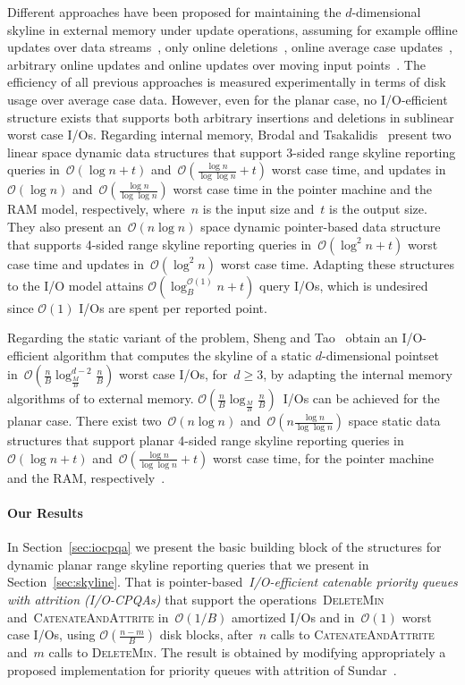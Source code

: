 \documentclass[]{article}
\newcommand{\bigO}{\mathcal{O}}
\begin{document}
Different approaches have been proposed for maintaining the $d$-dimensional
skyline in external memory under update operations, assuming for example offline
updates over data streams~\cite{TP06,MPG07}, only online
deletions~\cite{WAEA07}, online average case updates~\cite{PTFS05}, arbitrary
online updates \cite{HZK08} and online updates over moving input
points~\cite{HLOT06}. The efficiency of all previous approaches is measured
experimentally in terms of disk usage over average case data. However, even for
the planar case, no I/O-efficient structure exists that supports both arbitrary
insertions and deletions in sublinear worst case I/Os. Regarding internal
memory, Brodal and Tsakalidis~\cite{BT11} present two linear space dynamic data
structures that support 3-sided range skyline reporting queries in~$\bigO(\log n
+ t)$ and~$\bigO(\frac{\log n}{\log \log n} +t)$ worst case time, and updates
in~$\bigO(\log n)$ and~$\bigO(\frac{\log n}{\log \log n})$ worst case time in
the pointer machine and the RAM model, respectively, where~$n$ is the input size
and~$t$ is the output size. They also present an~$\bigO(n \log n)$ space dynamic
pointer-based data structure that supports 4-sided range skyline reporting
queries in~$\bigO(\log^2 n + t)$ worst case time and updates in~$\bigO(\log^2
n)$ worst case time. Adapting these structures to the I/O model attains
$\bigO(\log^{\bigO(1)}_B n + t)$ query I/Os, which is undesired since $\bigO(1)$
I/Os are spent per reported point.

Regarding the static variant of the problem, Sheng and Tao~\cite{ST11} obtain an
I/O-efficient algorithm that computes the skyline of a static $d$-dimensional
pointset in~$\bigO(\frac{n}{B}\log^{d-2}_{\frac{M}{B}}\frac{n}{B} )$ worst case
I/Os, for~$d\geq 3$, by adapting the internal memory algorithms of
\cite{KLP75,B80} to external memory. $\bigO(
\frac{n}{B}\log_{\frac{M}{B}}\frac{n}{B})$~I/Os can be achieved for the planar
case. There exist two~$\bigO(n \log n)$ and~$\bigO(n \frac{\log n}{\log \log
n})$ space static data structures that support planar 4-sided range skyline
reporting queries in~$\bigO(\log n +t )$ and~$\bigO(\frac{\log n}{\log \log n}
+ t)$ worst case time, for the pointer machine and the RAM,
respectively~\cite{KDKS11,DGKASK12}.

\paragraph{Our Results}

In Section~\ref{sec:iocpqa} we present the basic building block of the
structures for dynamic planar range skyline reporting queries that we present in
Section~\ref{sec:skyline}. That is pointer-based~\textit{I/O-efficient catenable
priority queues with attrition (I/O-CPQAs)} that support the
operations~\textsc{DeleteMin} and~\textsc{CatenateAndAttrite} in~$\bigO(1/B)$
amortized I/Os and in~$\bigO(1)$ worst case I/Os, using $\bigO(\frac{n-m}{B})$
disk blocks, after~$n$ calls to \textsc{CatenateAndAttrite} and~$m$ calls to
\textsc{DeleteMin}. The result is obtained by modifying appropriately a proposed
implementation for priority queues with attrition of Sundar~\cite{S89}.
 
\end{document}
